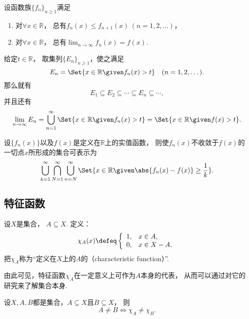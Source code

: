 \begin{example}
设函数族\(\{f_n\}_{n\geq1}\)满足
\begin{enumerate}
	\item 对\(\forall x\in\mathbb{R}\)，
	总有\(f_n(x) \leq f_{n+1}(x)\ (n=1,2,\dotsc)\)，
	\item 对\(\forall x\in\mathbb{R}\)，
	总有\(\lim_{n\to\infty} f_n(x) = f(x)\).
\end{enumerate}
给定\(t\in\mathbb{R}\)，
取集列\(\{E_n\}_{n\geq1}\)，使之满足\[
	E_n = \Set{ x\in\mathbb{R} \given f_n(x) > t }
	\quad(n=1,2,\dotsc).
\]
那么就有\[
	E_1 \subseteq E_2 \subseteq \dotsb \subseteq E_n \subseteq \dotsb,
\]
并且还有\[
	\lim_{n\to\infty} E_n
	= \bigcup_{n=1}^\infty \Set{ x\in\mathbb{R} \given f_n(x) > t }
	= \Set{ x\in\mathbb{R} \given f(x) > t }.
\]
\end{example}

\begin{proposition}
设\(\{f_n(x)\}\)以及\(f(x)\)是定义在\(\mathbb{R}\)上的实值函数，
则使\(f_n(x)\)不收敛于\(f(x)\)的一切点\(x\)所形成的集合可表示为\[
	\bigcup_{k=1}^\infty
	\bigcap_{N=1}^\infty
	\bigcup_{n=N}^\infty
	\Set{
		x\in\mathbb{R}
		\given
		\abs{f_n(x) - f(x)} \geq \frac1k
	}.
\]
\end{proposition}

\subsection{特征函数}
\begin{definition}
设\(X\)是集合，
\(A \subseteq X\).
定义：\[
	\chi_A(x)
	\defeq
	\left\{ \begin{array}{cl}
		1, & x \in A, \\
		0, & x \in X - A.
	\end{array} \right.
\]
把\(\chi_A\)称为“定义在\(X\)上的\(A\)的（characteristic function）”.
\end{definition}
由此可见，特征函数\(\chi_A\)在一定意义上可作为\(A\)本身的代表，
从而可以通过对它的研究来了解集合本身.

\begin{proposition}
设\(X,A,B\)都是集合，\(A \subseteq X\)且\(B \subseteq X\)，
则\[
	A \neq B \iff \chi_A \neq \chi_B.
\]
\end{proposition}

